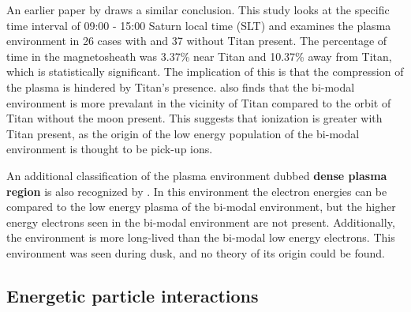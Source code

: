 \documentclass[12pt, parskip=full*, abstract]{scrartcl}
\begin{document}
An earlier paper by \textcite{Wei-WithOrWithoutTitan} draws a similar conclusion. This study looks at the specific time interval of 09:00 - 15:00 Saturn local time (SLT) and examines the plasma environment in 26 cases with and 37 without Titan present. The percentage of time in the magnetosheath was 3.37\% near Titan and 10.37\% away from Titan, which is statistically significant. The implication of this is that the compression of the plasma is hindered by Titan's presence. \textcite{Smith-WithOrWithoutTitan} also finds that the bi-modal environment is more prevalant in the vicinity of Titan compared to the orbit of Titan without the moon present. This suggests that ionization is greater with Titan present, as the origin of the low energy population of the bi-modal environment is thought to be pick-up ions. 

An additional classification of the plasma environment dubbed \textbf{dense plasma region} is also recognized by \textcite{Smith-WithOrWithoutTitan}. In this environment the electron energies can be compared to the low energy plasma of the bi-modal environment, but the higher energy electrons seen in the bi-modal environment are not present. Additionally, the environment is more long-lived than the bi-modal low energy electrons. This environment was seen during dusk, and no theory of its origin could be found.%

\subsection{Energetic particle interactions}


\end{document}
